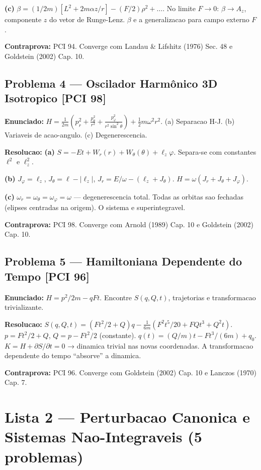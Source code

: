\documentclass[12pt,a4paper,oneside]{article}
\begin{document}
\textbf{(c)} $\beta=(1/2m)[L^2+2m\alpha z/r]-(F/2)\rho^2+\ldots$. No limite $F\to0$: $\beta\to A_z$, componente $z$ do vetor de Runge-Lenz. $\beta$ e a generalizacao para campo externo $F$.

\textbf{Contraprova:} PCI 94. Converge com Landau \& Lifshitz (1976) Sec. 48 e Goldstein (2002) Cap. 10.

\subsection{Problema 4 — Oscilador Harmônico 3D Isotropico [PCI 98]}
\textbf{Enunciado:} $H=\frac{1}{2m}(p_r^2+\frac{p_\theta^2}{r^2}+\frac{p_\varphi^2}{r^2\sin^2\theta})+\frac{1}{2}m\omega^2r^2$.
(a) Separacao H-J. (b) Variaveis de acao-angulo. (c) Degenerescencia.

\textbf{Resolucao:}
\textbf{(a)} $S=-Et+W_r(r)+W_\theta(\theta)+\ell_z\varphi$. Separa-se com constantes $\ell^2$ e $\ell_z^2$.

\textbf{(b)} $J_\varphi=\ell_z$, $J_\theta=\ell-|\ell_z|$, $J_r=E/\omega-(\ell_z+J_\theta)$. $H=\omega(J_r+J_\theta+J_\varphi)$.

\textbf{(c)} $\omega_r=\omega_\theta=\omega_\varphi=\omega$ — degenerescencia total. Todas as orbitas sao fechadas (elipses centradas na origem). O sistema e superintegravel.

\textbf{Contraprova:} PCI 98. Converge com Arnold (1989) Cap. 10 e Goldstein (2002) Cap. 10.

\subsection{Problema 5 — Hamiltoniana Dependente do Tempo [PCI 96]}
\textbf{Enunciado:} $H=p^2/2m-qFt$. Encontre $S(q,Q,t)$, trajetorias e transformacao trivializante.

\textbf{Resolucao:}
$S(q,Q,t)=(Ft^2/2+Q)q-\frac{1}{6m}(F^2t^5/20+FQt^3+Q^2t)$. $p=Ft^2/2+Q$, $Q=p-Ft^2/2$ (constante).
$q(t)=(Q/m)t-Ft^3/(6m)+q_0$. $K=H+\partial S/\partial t=0$ → dinamica trivial nas novas coordenadas.
A transformacao dependente do tempo ``absorve'' a dinamica.

\textbf{Contraprova:} PCI 96. Converge com Goldstein (2002) Cap. 10 e Lanczos (1970) Cap. 7.

\section{Lista 2 — Perturbacao Canonica e Sistemas Nao-Integraveis (5 problemas)}
\end{document}
